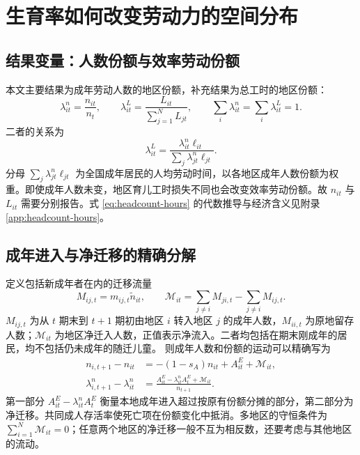 \documentclass[UTF8,a4paper,zihao=-4,fontset=windows]{ctexart}
\numberwithin{equation}{section}
\begin{document}
\section{生育率如何改变劳动力的空间分布}
\label{sec:spatial-outcomes}

\subsection{结果变量：人数份额与效率劳动份额}
本文主要结果为成年劳动人数的地区份额，补充结果为总工时的地区份额：
\begin{equation}
  \lambda^n_{it}=\frac{n_{it}}{n_t},\qquad
  \lambda^L_{it}=\frac{L_{it}}{\sum_{j=1}^N L_{jt}},\qquad
  \sum_i\lambda^n_{it}=\sum_i\lambda^L_{it}=1.
  \label{eq:spatial-shares}
\end{equation}
二者的关系为
\begin{equation}
  \lambda^L_{it}=\frac{\lambda^n_{it}\ell_{it}}
      {\sum_j\lambda^n_{jt}\ell_{jt}}.
  \label{eq:headcount-hours}
\end{equation}
分母 $\sum_j\lambda^n_{jt}\ell_{jt}$ 为全国成年居民的人均劳动时间，以各地区成年人数份额为权重。即使成年人数未变，地区育儿工时损失不同也会改变效率劳动份额。故 $n_{it}$ 与 $L_{it}$ 需要分别报告。式 \eqref{eq:headcount-hours} 的代数推导与经济含义见附录\ref{app:headcount-hours}。

\subsection{成年进入与净迁移的精确分解}
定义包括新成年者在内的迁移流量
\begin{equation}
  M_{ij,t}=m_{ij,t}\widetilde n_{it},\qquad
  \mathcal M_{it}=\sum_{j\ne i}M_{ji,t}-\sum_{j\ne i}M_{ij,t}.
  \label{eq:migration-flows}
\end{equation}
$M_{ij,t}$ 为从 $t$ 期末到 $t+1$ 期初由地区 $i$ 转入地区 $j$ 的成年人数，$M_{ii,t}$ 为原地留存人数；$\mathcal M_{it}$ 为地区净迁入人数，正值表示净流入。二者均包括在期末刚成年的居民，均不包括仍未成年的随迁儿童。
则成年人数和份额的运动可以精确写为
\begin{align}
  n_{i,t+1}-n_{it}
     &=-(1-s_A)n_{it}+A^E_{it}+\mathcal M_{it},\\
  \lambda^n_{i,t+1}-\lambda^n_{it}
     &=\frac{A^E_{it}-\lambda^n_{it}A^E_t+\mathcal M_{it}}
                  {n_{t+1}}.
  \label{eq:share-decomposition}
\end{align}
第一部分 $A^E_{it}-\lambda^n_{it}A^E_t$ 衡量本地成年进入超过按原有份额分摊的部分，第二部分为净迁移。共同成人存活率使死亡项在份额变化中抵消。多地区的守恒条件为 $\sum_{i=1}^N\mathcal M_{it}=0$；任意两个地区的净迁移一般不互为相反数，还要考虑与其他地区的流动。
\end{document}
